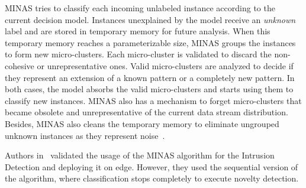 MINAS tries to classify each incoming unlabeled instance according to the
current decision model. Instances unexplained by the model
receive an \textit{unknown} label and are stored in temporary memory for future
analysis.
When this temporary memory reaches a parameterizable size, MINAS groups the
instances to form new micro-clusters.
Each micro-cluster is validated to discard the non-cohesive or unrepresentative
ones.
Valid micro-clusters are analyzed to decide if they represent an extension of a
known pattern or a completely new pattern. In both cases, the model absorbs the
valid micro-clusters and starts using them to classify new instances.
MINAS also has a mechanism to forget micro-clusters that became obsolete and
unrepresentative of the current data stream distribution.
Besides, MINAS also cleans the temporary memory to eliminate ungrouped unknown
instances as they represent noise~\cite{Faria2016minas}.


Authors in~\cite{Cassales2019a} validated the usage of the MINAS algorithm for
the Intrusion Detection and deploying it on edge. However, they used the
sequential version of the algorithm, where classification stops completely to
execute novelty detection.

